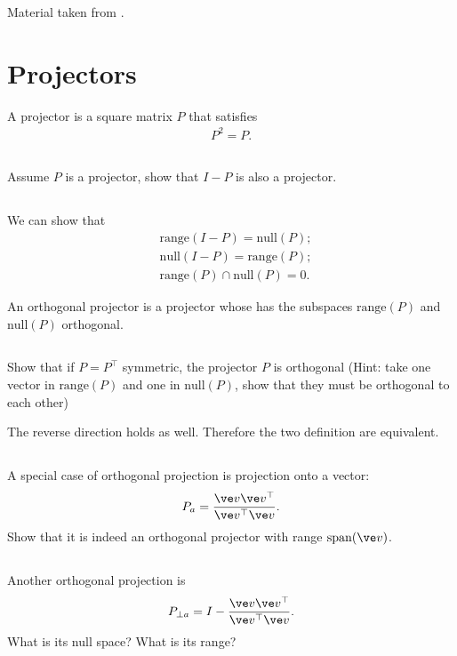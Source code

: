 \documentclass[11pt,letterpaper]{article}
\begin{document}
Material taken from \cite[Lecture 6 and 10]{TrefethenBau_97}.

\section{Projectors}
A projector is a square matrix $P$ that satisfies
\begin{align*}
    P^2 = P.
\end{align*}

\subsection{}
Assume $P$ is a projector, show that $I-P$ is also a projector.

\subsection{}
We can show that
\begin{align*}
    & \text{range}(I-P) = \text{null}(P);\\
    & \text{null}(I-P) = \text{range}(P);\\
    & \text{range}(P) \cap \text{null}(P) = 0.
\end{align*}

An orthogonal projector is a projector whose has the subspaces $\text{range}(P)$ and $\text{null}(P)$ orthogonal.

\subsection{}
Show that if $P=P^\top$ symmetric, the projector $P$ is orthogonal (Hint: take one vector in $\text{range}(P)$ and one in $\text{null}(P)$, show that they must be orthogonal to each other)

The reverse direction holds as well. Therefore the two definition are equivalent.

\subsection{}
A special case of orthogonal projection is projection onto a vector:
\begin{align*}
    P_a = \frac{\ve v \ve v^\top}{\ve v^\top \ve v}.
\end{align*}
Show that it is indeed an orthogonal projector with range $\text{span}(\ve v)$.

\subsection{}
Another orthogonal projection is
\begin{align*}
    P_{\perp a} = I-\frac{\ve v \ve v^\top}{\ve v^\top \ve v}.
\end{align*}
What is its null space? What is its range?
\end{document}
